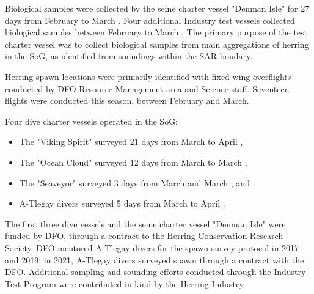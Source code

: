 Biological samples were collected by the seine charter vessel "Denman Isle"
for 27 days from February  to March .
Four additional Industry test vessels collected biological samples
between February  to March .
The primary purpose of the test charter vessel was to
collect biological samples from main aggregations of herring in the SoG,
as identified from soundings within the SAR boudary. 

Herring spawn locations were primarily identified with fixed-wing overflights
conducted by DFO Resource Management area and Science staff.
Seventeen flights were conducted this season, between February and March.

Four dive charter vessels operated in the SoG:
\begin{itemize}
\item The "Viking Spirit" surveyed 21 days from March  to April ,
\item The "Ocean Cloud" surveyed 12 days from March  to March ,
\item The "Seaveyor" surveyed 3 days from March  and March , and
\item A-Tlegay divers surveyed 5 days from March  to April .
\end{itemize}
The first three dive vessels and the seine charter vessel "Denman Isle"
were funded by DFO, through a contract to the Herring Conservation Research Society.
DFO mentored A-Tlegay divers for the spawn survey protocol in 2017 and 2019;
in 2021, A-Tlegay divers surveyed spawn through a contract with the DFO.
Additional sampling and sounding efforts conducted through the
Industry Test Program were contributed in-kind by the Herring Industry.
